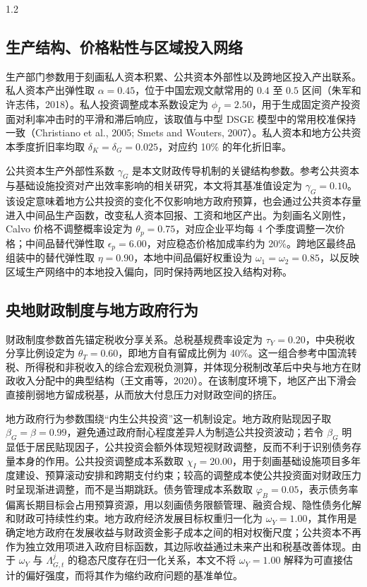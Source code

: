\documentclass[12pt,UTF8]{ctexart}
\begin{document}
\begin{spacing}{1.2}
		\subsection{生产结构、价格粘性与区域投入网络}
		
		生产部门参数用于刻画私人资本积累、公共资本外部性以及跨地区投入产出联系。私人资本产出弹性取 $\alpha=0.45$，位于中国宏观文献常用的 $0.4$ 至 $0.5$ 区间（朱军和许志伟，2018）。私人投资调整成本系数设定为 $\phi_I=2.50$，用于生成固定资产投资面对利率冲击时的平滑和滞后响应，该取值与中型 DSGE 模型中的常用校准保持一致（Christiano et al., 2005; Smets and Wouters, 2007）。私人资本和地方公共资本季度折旧率均取 $\delta_K=\delta_G=0.025$，对应约 10\% 的年化折旧率。
		
		公共资本生产外部性系数 $\gamma_G$ 是本文财政传导机制的关键结构参数。参考公共资本与基础设施投资对产出效率影响的相关研究，本文将其基准值设定为 $\gamma_G=0.10$。该设定意味着地方公共投资的变化不仅影响地方政府预算，也会通过公共资本存量进入中间品生产函数，改变私人资本回报、工资和地区产出。为刻画名义刚性，Calvo 价格不调整概率设定为 $\theta_p=0.75$，对应企业平均每 4 个季度调整一次价格；中间品替代弹性取 $\epsilon_p=6.00$，对应稳态价格加成率约为 20\%。跨地区最终品组装中的替代弹性取 $\eta=0.90$，本地中间品偏好权重设为 $\omega_1=\omega_2=0.85$，以反映区域生产网络中的本地投入偏向，同时保持两地区投入结构对称。
		
		\subsection{央地财政制度与地方政府行为}
		
		财政制度参数首先锚定税收分享关系。总税基规费率设定为 $\tau_Y=0.20$，中央税收分享比例设定为 $\theta_T=0.60$，即地方自有留成比例为 40\%。这一组合参考中国流转税、所得税和非税收入的综合宏观税负测算，并体现分税制改革后中央与地方在财政收入分配中的典型结构（王文甫等，2020）。在该制度环境下，地区产出下滑会直接削弱地方留成税基，从而放大付息压力对财政空间的挤压。
		
		地方政府行为参数围绕“内生公共投资”这一机制设定。地方政府贴现因子取 $\beta_G=\beta=0.99$，避免通过政府耐心程度差异人为制造公共投资波动；若令 $\beta_G$ 明显低于居民贴现因子，公共投资会额外体现短视财政调整，反而不利于识别债务存量本身的作用。公共投资调整成本系数取 $\chi_I=20.00$，用于刻画基础设施项目多年度建设、预算滚动安排和跨期支付约束；较高的调整成本使公共投资面对财政压力时呈现渐进调整，而不是当期跳跃。债务管理成本系数取 $\varphi_B=0.05$，表示债务率偏离长期目标会占用预算资源，用以刻画债务限额管理、融资合规、隐性债务化解和财政可持续性约束。地方政府经济发展目标权重归一化为 $\omega_Y=1.00$，其作用是确定地方政府在发展收益与财政资金影子成本之间的相对权衡尺度；公共资本不再作为独立效用项进入政府目标函数，其边际收益通过未来产出和税基改善体现。由于 $\omega_Y$ 与 $\Lambda_{G,t}^j$ 的稳态尺度存在归一化关系，本文不将 $\omega_Y=1.00$ 解释为可直接估计的偏好强度，而将其作为缩约政府问题的基准单位。
		

\end{spacing}
\end{document}
